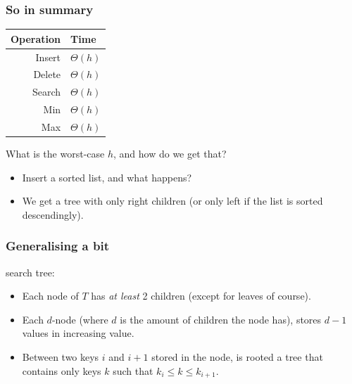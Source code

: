 \begin{frame}
	\frametitle{So in summary}
	\begin{tabular}{r | l}
		Operation & Time \\
		\midrule
		Insert & $\Theta(h)$ \\
		Delete & $\Theta(h)$ \\
		Search & $\Theta(h)$ \\
		Min & $\Theta(h)$ \\
		Max & $\Theta(h)$ \\
	\end{tabular}
		
		What is the worst-case $h$, and how do we get that?
	
			\begin{itemize}
				\item Insert a sorted list, and what happens? \\
		 				\item We get a tree with only right children (or only left if the list is sorted descendingly).
	\end{itemize}
	
\end{frame}

\begin{frame}
	\frametitle{Generalising a bit}
 search tree:
			\begin{itemize}
				\item Each node of $T$ has \textit{at least} 2 children (except for leaves of course).
				\item Each $d$-node (where $d$ is the amount of children the node has), stores $d-1$ values in increasing value.
				\item Between two keys $i$ and $i+1$ stored in the node, is rooted a tree that contains only keys $k$ such that
					$k_i \leq k \leq k_{i+1}$.
			\end{itemize}
			

	
\end{frame}

